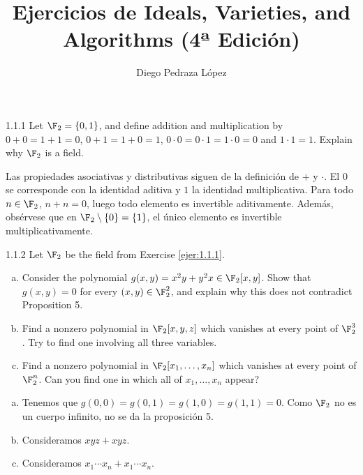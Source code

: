 \documentclass[twoside]{article}
\begin{document}
\title{Ejercicios de Ideals, Varieties, and Algorithms (4ª Edición)}
\author{Diego Pedraza López}
\maketitle

\begin{ejercicio}{1.1.1}
Let $\F_2 = \{0,1\}$, and define addition and multiplication by $0+0=1+1=0$, $0+1=1+0=1$, $0\cdot 0=0\cdot 1 = 1 \cdot 0 = 0$ and $1 \cdot 1 = 1$.
Explain why $\F_2$ is a field.
\end{ejercicio}
\begin{solucion}
Las propiedades asociativas y distributivas siguen de la definición de $+$ y $\cdot$.
El $0$ se corresponde con la identidad aditiva y $1$ la identidad multiplicativa.
Para todo $n \in \F_2$, $n+n=0$, luego todo elemento es invertible aditivamente.
Además, obsérvese que en $\F_2 \setminus \{0\} = \{1\}$, el único elemento es invertible multiplicativamente.
\end{solucion}

\newpage

\begin{ejercicio}{1.1.2}
Let $\F_2$ be the field from Exercise \ref{ejer:1.1.1}.
\begin{enumerate}[a.]
\item Consider the polynomial $g(x,y)=x^2y+y^2x \in \F_2[x,y]$.
Show that $g(x,y)=0$ for every $(x,y) \in \F_2^2$, and explain why this does not contradict Proposition 5.
\item Find a nonzero polynomial in $\F_2[x,y,z]$ which vanishes at every point of $\F_2^3$.
Try to find one involving all three variables.
\item Find a nonzero polynomial in $\F_2[x_1,\dots,x_n]$ which vanishes at every point of $\F_2^n$.
Can you find one in which all of $x_1,\dots,x_n$ appear?
\end{enumerate}
\end{ejercicio}
\begin{solucion}
\begin{enumerate}[a.]
\item Tenemos que $g(0,0)=g(0,1)=g(1,0)=g(1,1)=0$.
Como $\F_2$ no es un cuerpo infinito, no se da la proposición 5.
\item Consideramos $xyz+xyz$.
\item Consideramos $x_1\cdots x_n + x_1\cdots x_n$.
\end{enumerate}
\end{solucion}
\end{document}
